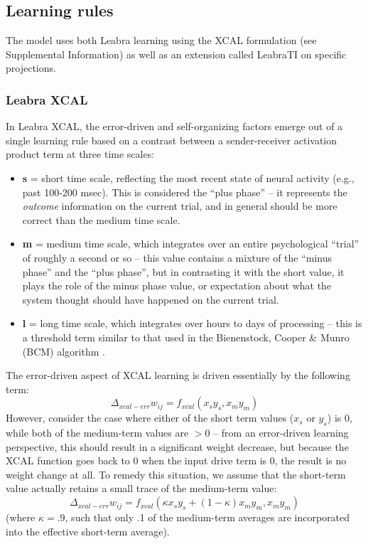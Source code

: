 \documentclass[10pt,letterpaper]{article}
\newcommand{\wij}{w_{ij}}
\numberwithin{equation}{section}
\begin{document}
\subsection{Learning rules} 

The model uses both Leabra learning using the XCAL formulation (see  Supplemental Information) as well as an extension called LeabraTI on specific projections.

\subsubsection{Leabra XCAL}

In Leabra XCAL, the error-driven and self-organizing factors emerge out of a
single learning rule based on a contrast between a sender-receiver
activation product term at three time scales:

\begin{itemize}
\item {\bf s} = short time scale, reflecting the most recent state of neural
 activity (e.g., past 100-200 msec). This is considered the ``plus phase''
 -- it represents the {\em outcome} information on the current trial, and in
 general should be more correct than the medium time scale.
\item {\bf m} = medium time scale, which integrates over an entire
 psychological ``trial'' of roughly a second or so -- this value contains a
 mixture of the ``minus phase'' and the ``plus phase'', but in contrasting it
 with the short value, it plays the role of the minus phase value, or
 expectation about what the system thought should have happened on the
 current trial.
\item {\bf l} = long time scale, which integrates over hours to days of
 processing -- this is a threshold term similar to that used in the  Bienenstock, Cooper \& Munro (BCM) algorithm \cite{Bienenstock:1982}.
\end{itemize}

The error-driven aspect of XCAL learning is driven essentially by the
following term: 
\begin{equation}
 \Delta_{xcal-err} \wij = f_{xcal} ( x_s y_s, x_m y_m )
 \label{eq.xcal-err}
\end{equation}
However, consider the case where either of the short term values ($x_s$ or
$y_s$) is 0, while both of the medium-term values are $>0$ -- from an
error-driven learning perspective, this should result in a significant weight
decrease, but because the XCAL function goes back to 0 when the input drive
term is 0, the result is no weight change at all. To remedy this situation,
we assume that the short-term value actually retains a small trace of the
medium-term value:
\begin{equation}
 \Delta_{xcal-err} \wij = f_{xcal} ( \kappa x_s y_s + (1-\kappa) x_m y_m, x_m y_m)
 \label{eq.xcal-err2}
\end{equation}
(where $\kappa = .9$, such that only .1 of the medium-term averages are
incorporated into the effective short-term average).
\end{document}
